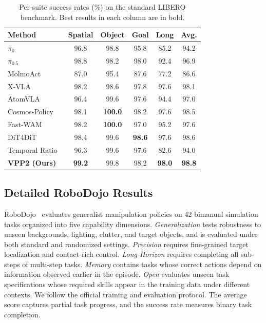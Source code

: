 \begin{table}[h]
\centering
\small
\begin{tabular}{lccccc}
\toprule
Method & Spatial & Object & Goal & Long & Avg. \\
\midrule
$\pi_0$~\citep{black2024pi_0} & 96.8 & 98.8 & 95.8 & 85.2 & 94.2 \\
$\pi_{0.5}$~\citep{intelligence2025pi_} & 98.8 & 98.2 & 98.0 & 92.4 & 96.9 \\
MolmoAct~\citep{lee2025molmoact} & 87.0 & 95.4 & 87.6 & 77.2 & 86.6 \\
X-VLA~\citep{zheng2026xvla} & 98.2 & 98.6 & 97.8 & 97.6 & 98.1 \\
AtomVLA~\citep{sun2026atomvla} & 96.4 & 99.6 & 97.6 & 94.4 & 97.0 \\
\midrule
Cosmos-Policy~\citep{kim2026cosmospolicy} & 98.1 & \textbf{100.0} & 98.2 & 97.6 & 98.5 \\
Fast-WAM~\citep{yuan2026fastwam} & 98.2 & \textbf{100.0} & 97.0 & 95.2 & 97.6 \\
DiT4DiT~\citep{ma2026dit4dit} & 98.4 & 99.6 & \textbf{98.6} & 97.6 & 98.6 \\
Temporal Ratio~\citep{mishra2026understanding} & 96.3 & 99.6 & 97.6 & 82.6 & 94.0 \\
\midrule
\textbf{VPP2 (Ours)} & \textbf{99.2} & 99.8 & 98.2 & \textbf{98.0} & \textbf{98.8} \\
\bottomrule
\end{tabular}
\caption{Per-suite success rates (\%) on the standard LIBERO benchmark. Best results in each column are in bold.}
\label{tab:app_libero}
\end{table}

\subsection{Detailed RoboDojo Results}\label{app_robodojo}
RoboDojo~\citep{chen2026robodojo} evaluates generalist manipulation policies on 42 bimanual simulation tasks organized into five capability dimensions. \textit{Generalization} tests robustness to unseen backgrounds, lighting, clutter, and target objects, and is evaluated under both standard and randomized settings. \textit{Precision} requires fine-grained target localization and contact-rich control. \textit{Long-Horizon} requires completing all sub-steps of multi-step tasks. \textit{Memory} contains tasks whose correct actions depend on information observed earlier in the episode. \textit{Open} evaluates unseen task specifications whose required skills appear in the training data under different contexts. We follow the official training and evaluation protocol. The average score captures partial task progress, and the success rate measures binary task completion.

